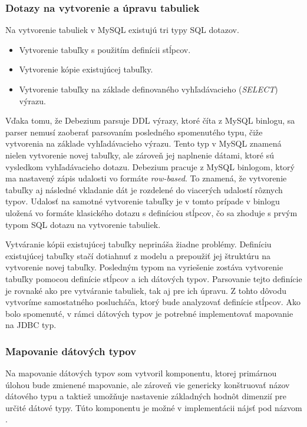 \subsubsection{Dotazy na vytvorenie a úpravu tabuliek}\label{createAlterTable}
Na vytvorenie tabuliek v MySQL existujú tri typy SQL dotazov. 
\begin{itemize}
\item Vytvorenie tabuľky s použitím definícii stĺpcov.
\item Vytvorenie kópie existujúcej tabuľky.
\item Vytvorenie tabuľky na základe definovaného vyhľadávacieho (\textit{SELECT}) výrazu.
\end{itemize}

Vďaka tomu, že Debezium parsuje DDL výrazy, ktoré číta z MySQL binlogu, sa parser nemusí zaoberať parsovaním posledného spomenutého typu, čiže vytvorenia na základe vyhľadávacieho výrazu. Tento typ v MySQL znamená nielen vytvorenie novej tabuľky, ale zároveň jej naplnenie dátami, ktoré sú vysledkom vyhľadávacieho dotazu. Debezium pracuje z MySQL binlogom, ktorý ma nastavený zápis udalosti vo formáte \textit{row-based}. To znamená, že vytvorenie tabuľky aj následné vkladanie dát je rozdelené do viacerých udalostí rôznych typov. Udalosť na samotné vytvorenie tabuľky je v tomto prípade v binlogu uložená vo formáte klasického dotazu s definíciou stĺpcov, čo sa zhoduje s prvým typom SQL dotazu na vytvorenie tabuliek.

Vytváranie kópii existujúcej tabuľky neprináša žiadne problémy. Definíciu existujúcej tabuľky stačí dotiahnuť z modelu a prepoužiť jej štruktúru na vytvorenie novej tabuľky. Posledným typom na vyriešenie zostáva vytvorenie tabuľky pomocou definície stĺpcov a ich dátových typov. Parsovanie tejto definície je rovnaké ako pre vytváranie tabuliek, tak aj pre ich úpravu. Z tohto dôvodu vytvoríme samostatného poslucháča, ktorý bude analyzovať definície stĺpcov. Ako bolo spomenuté, v rámci dátových typov je potrebné implementovať mapovanie na JDBC typ.

\subsubsection{Mapovanie dátových typov}
Na mapovanie dátových typov som vytvoril komponentu, ktorej primárnou úlohou bude zmienené mapovanie, ale zároveň vie genericky konštruovať názov dátového typu a taktiež umožňuje nastavenie základných hodnôt dimenzií pre určité dátové typy. Túto komponentu je možné v implementácii nájsť pod názvom .

